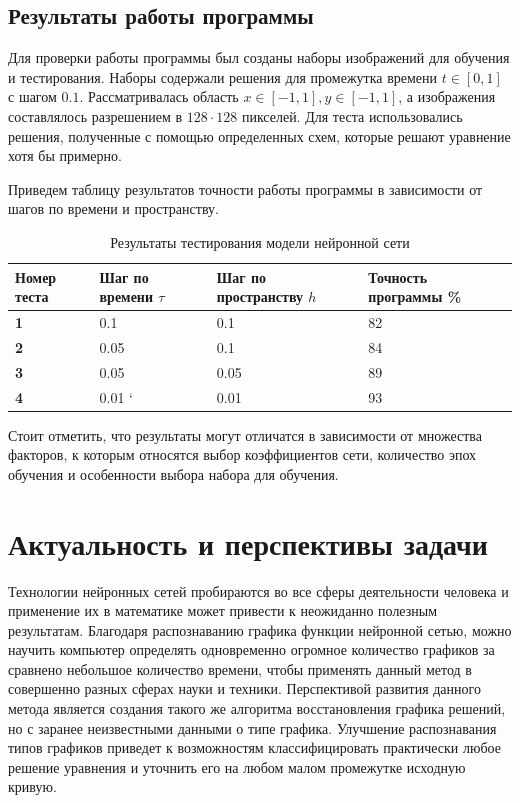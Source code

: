 \documentclass[12pt, a4paper]{article}
\begin{document}
\subsection{Результаты работы программы}
Для проверки работы программы был созданы наборы изображений для обучения и тестирования. Наборы содержали решения для промежутка времени $t \in [0, 1]$ с шагом $0.1$. Рассматривалась область $x \in [-1, 1], y \in [-1, 1]$, а изображения составлялось разрешением в $128 \cdot 128$ пикселей. Для теста использовались решения, полученные с помощью определенных схем, которые решают уравнение хотя бы примерно. 

Приведем таблицу результатов точности работы программы в зависимости от шагов по времени и пространству.

\begin{table}[ht!]
	\caption{Результаты тестирования модели нейронной сети}
	\centering
	\begin{tabular}{|l|l|l|l|}
		\hline
		Номер теста & Шаг по времени $\tau$  & Шаг по пространству $h$ & Точность программы \%      \\ \hline
		\textbf{1}  & 0.1                    & 0.1    				   & 82          				\\ \hline
		\textbf{2}  & 0.05                    & 0.1   			       & 84         				\\ \hline
		\textbf{3}  & 0.05                   & 0.05   				   & 89        			    \\ \hline
		\textbf{4}  & 0.01     `			 & 0.01  				   & 93     					\\ \hline
	\end{tabular}
\end{table}

Стоит отметить, что результаты могут отличатся в зависимости от множества факторов, к которым относятся выбор коэффициентов сети, количество эпох обучения и особенности выбора набора для обучения.

\section{Актуальность и перспективы задачи}
Технологии нейронных сетей пробираются во все сферы деятельности человека и применение их в математике может привести к неожиданно полезным результатам. Благодаря распознаванию графика функции нейронной сетью, можно научить компьютер определять одновременно огромное количество графиков за сравнено небольшое количество времени, чтобы применять данный метод в совершенно разных сферах науки и техники. Перспективой развития данного метода является создания такого же алгоритма восстановления графика решений, но с заранее неизвестными данными о типе графика. Улучшение распознавания типов графиков приведет к возможностям классифицировать практически любое решение уравнения и уточнить его на любом малом промежутке исходную кривую.
\end{document}
